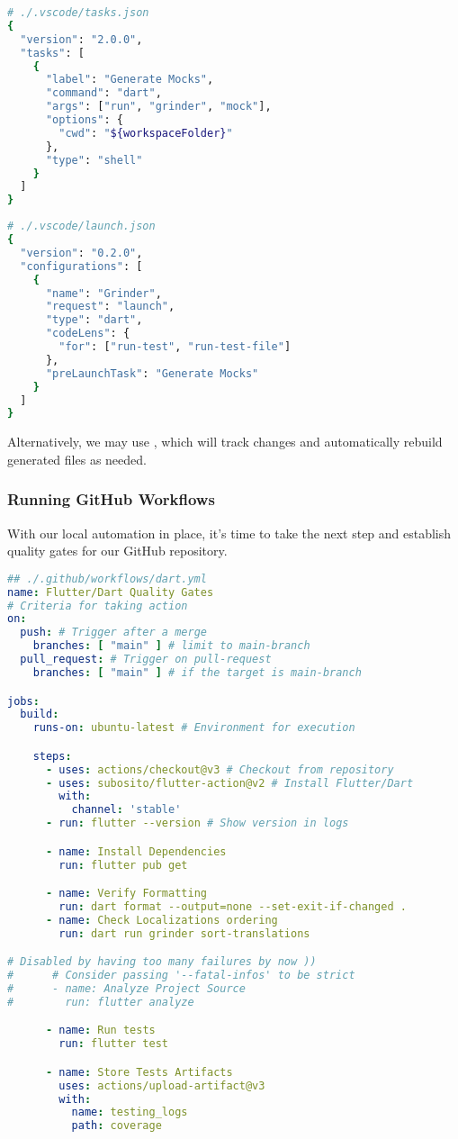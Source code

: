 \begin{lstlisting}[language=bash]
# ./.vscode/tasks.json
{
  "version": "2.0.0",
  "tasks": [
    {
      "label": "Generate Mocks",
      "command": "dart",
      "args": ["run", "grinder", "mock"],
      "options": {
        "cwd": "${workspaceFolder}"
      },
      "type": "shell"
    }
  ]
}
\end{lstlisting}
\newpage
\begin{lstlisting}[language=bash]
# ./.vscode/launch.json
{
  "version": "0.2.0",
  "configurations": [
    {
      "name": "Grinder",
      "request": "launch",
      "type": "dart",
      "codeLens": {
        "for": ["run-test", "run-test-file"]
      },
      "preLaunchTask": "Generate Mocks"
    }
  ]
}
\end{lstlisting}

\noindent Alternatively, we may use , which will track changes and automatically 
rebuild generated files as needed.


\subsubsection{Running GitHub Workflows}

With our local automation in place, it's time to take the next step and establish quality gates for our GitHub repository.

\begin{lstlisting}[language=yaml]
## ./.github/workflows/dart.yml
name: Flutter/Dart Quality Gates
# Criteria for taking action
on:
  push: # Trigger after a merge
    branches: [ "main" ] # limit to main-branch
  pull_request: # Trigger on pull-request
    branches: [ "main" ] # if the target is main-branch

jobs:
  build:
    runs-on: ubuntu-latest # Environment for execution

    steps:
      - uses: actions/checkout@v3 # Checkout from repository
      - uses: subosito/flutter-action@v2 # Install Flutter/Dart
        with:
          channel: 'stable'
      - run: flutter --version # Show version in logs

      - name: Install Dependencies
        run: flutter pub get

      - name: Verify Formatting
        run: dart format --output=none --set-exit-if-changed .
      - name: Check Localizations ordering
        run: dart run grinder sort-translations

# Disabled by having too many failures by now ))
#      # Consider passing '--fatal-infos' to be strict
#      - name: Analyze Project Source
#        run: flutter analyze

      - name: Run tests
        run: flutter test

      - name: Store Tests Artifacts
        uses: actions/upload-artifact@v3
        with:
          name: testing_logs
          path: coverage
\end{lstlisting}

